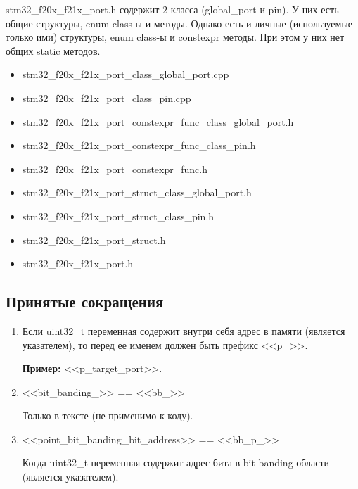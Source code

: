 \begin{enumerate}
	stm32\_f20x\_f21x\_port.h содержит 2 класса (global\_port и pin). У них есть общие структуры, enum class-ы и методы. Однако есть и личные (используемые только ими) структуры, enum class-ы и constexpr методы. При этом у них нет общих static методов.
	\begin{itemize}
		\item stm32\_f20x\_f21x\_port\_class\_global\_port.cpp
		\item stm32\_f20x\_f21x\_port\_class\_pin.cpp 
		\item stm32\_f20x\_f21x\_port\_constexpr\_func\_class\_global\_port.h
		\item stm32\_f20x\_f21x\_port\_constexpr\_func\_class\_pin.h
		\item stm32\_f20x\_f21x\_port\_constexpr\_func.h
		\item stm32\_f20x\_f21x\_port\_struct\_class\_global\_port.h
		\item stm32\_f20x\_f21x\_port\_struct\_class\_pin.h
		\item stm32\_f20x\_f21x\_port\_struct.h
		\item stm32\_f20x\_f21x\_port.h
	\end{itemize}
\end{enumerate}

\subsection{Принятые сокращения}
\label{sk:0}
\begin{enumerate}
	\item Если uint32\_t переменная содержит внутри себя адрес в памяти (является указателем), то перед ее именем должен быть префикс <<p\_>>.
	
	\textbf{Пример:} <<p\_target\_port>>.
	\item <<bit\_banding\_>> == <<bb\_>>
	
	Только в тексте (не применимо к коду).
	\item <<point\_bit\_banding\_bit\_address>> == <<bb\_p\_>>
	
	Когда uint32\_t переменная содержит адрес бита в bit banding области (является указателем).
	
\end{enumerate}

